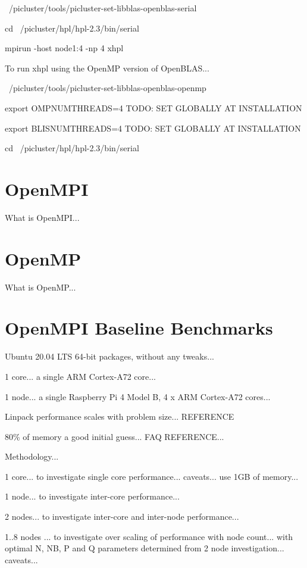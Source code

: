 \documentclass{article}
\begin{document}
~/picluster/tools/picluster-set-libblas-openblas-serial

cd ~/picluster/hpl/hpl-2.3/bin/serial

mpirun -host node1:4 -np 4 xhpl



To run xhpl using the OpenMP version of OpenBLAS...

~/picluster/tools/picluster-set-libblas-openblas-openmp

export OMPNUMTHREADS=4 TODO: SET GLOBALLY AT INSTALLATION

export BLISNUMTHREADS=4 TODO: SET GLOBALLY AT INSTALLATION

cd ~/picluster/hpl/hpl-2.3/bin/serial



\section{OpenMPI}

What is OpenMPI...



\section{OpenMP}

What is OpenMP...



\section{OpenMPI Baseline Benchmarks}

Ubuntu 20.04 LTS 64-bit packages, without any tweaks...

1 core... a single ARM Cortex-A72 core...

1 node... a single Raspberry Pi 4 Model B, 4 x ARM Cortex-A72 cores...

Linpack performance scales with problem size... REFERENCE

80\% of memory a good initial guess... FAQ REFERENCE...


Methodology...

1 core... to investigate single core performance... caveats... use 1GB of memory...

1 node... to investigate inter-core performance...

2 nodes... to investigate inter-core and inter-node performance...

1..8 nodes ... to investigate over scaling of performance with node count... with optimal N, NB, P and Q parameters determined from 2 node investigation... caveats...
\end{document}
